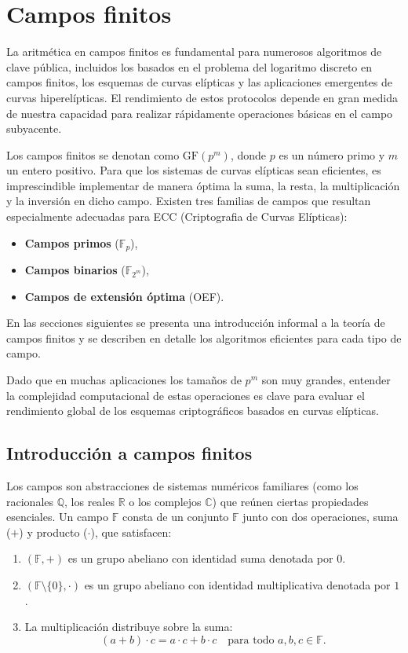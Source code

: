 \chapter{Campos finitos}
La aritmética en campos finitos es fundamental para numerosos algoritmos de clave pública, incluidos los basados en el problema del logaritmo discreto en campos finitos, los esquemas de curvas elípticas y las aplicaciones emergentes de curvas hiperelípticas. El rendimiento de estos protocolos depende en gran medida de nuestra capacidad para realizar rápidamente operaciones básicas en el campo subyacente.  

Los campos finitos se denotan como \(\mathrm{GF}(p^m)\), donde \(p\) es un número primo y \(m\) un entero positivo. Para que los sistemas de curvas elípticas sean eficientes, es imprescindible implementar de manera óptima la suma, la resta, la multiplicación y la inversión en dicho campo. Existen tres familias de campos que resultan especialmente adecuadas para ECC (Criptografia de Curvas Elípticas):  
\begin{itemize}
  \item \textbf{Campos primos} (\(\mathbb{F}_p\)),  
  \item \textbf{Campos binarios} (\(\mathbb{F}_{2^m}\)),  
  \item \textbf{Campos de extensión óptima} (OEF).  
\end{itemize}
En las secciones siguientes se presenta una introducción informal a la teoría de campos finitos y se describen en detalle los algoritmos eficientes para cada tipo de campo.  

Dado que en muchas aplicaciones los tamaños de \(p^m\) son muy grandes, entender la complejidad computacional de estas operaciones es clave para evaluar el rendimiento global de los esquemas criptográficos basados en curvas elípticas.  

\section{Introducción a campos finitos}
Los campos son abstracciones de sistemas numéricos familiares (como los racionales \(\mathbb{Q}\), los reales \(\mathbb{R}\) o los complejos \(\mathbb{C}\)) que reúnen ciertas propiedades esenciales. Un campo \(\mathbb{F}\) consta de un conjunto \(\mathbb{F}\) junto con dos operaciones, suma (\(+\)) y producto (\(\cdot\)), que satisfacen:

\begin{enumerate}
  \item $(\mathbb{F},+)$ es un grupo abeliano con identidad suma denotada por $0$.
  \item $(\mathbb{F}\setminus\{0\},\cdot)$ es un grupo abeliano con identidad multiplicativa denotada por $1$.
  \item La multiplicación distribuye sobre la suma:
    \[
      (a + b)\cdot c = a\cdot c + b\cdot c
      \quad\text{para todo }a,b,c\in\mathbb{F}.
    \]
\end{enumerate}

